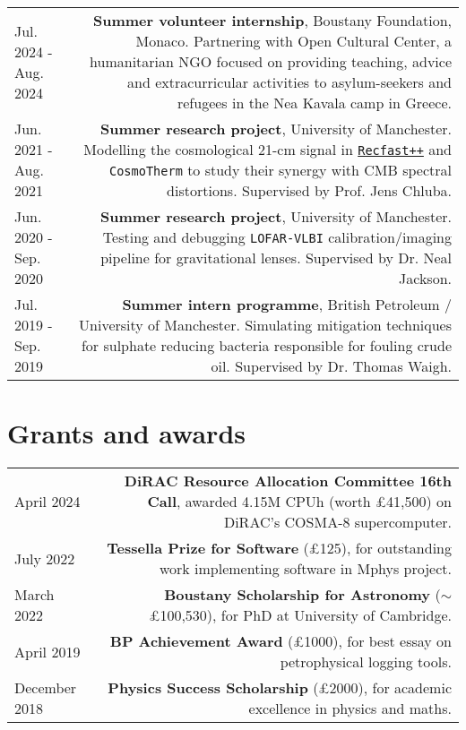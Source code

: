 \documentclass{article}
\begin{document}
\begin{longtable}{L!{\vrule}R}
    Jul. 2024 - Aug. 2024 & \textbf{Summer volunteer internship}, Boustany Foundation, Monaco. Partnering with Open Cultural Center, a humanitarian NGO focused on providing teaching, advice and extracurricular activities to asylum-seekers and refugees in the Nea Kavala camp in Greece.  \\
    Jun. 2021 - Aug. 2021 & \textbf{Summer research project}, University of Manchester. Modelling the cosmological 21-cm signal in \href{https://bitbucket.org/Jacetoto/recfast-.vx/src/Recfast_JD_21cm_modelling/}{\texttt{Recfast++}} and \texttt{CosmoTherm} to study their synergy with CMB spectral distortions. Supervised by Prof. Jens Chluba. \\
    Jun. 2020 - Sep. 2020 & \textbf{Summer research project}, University of Manchester. Testing and debugging \texttt{LOFAR-VLBI} calibration/imaging pipeline for gravitational lenses. Supervised by Dr. Neal Jackson.\\
    Jul. 2019 - Sep. 2019 & \textbf{Summer intern programme}, British Petroleum / University of Manchester. Simulating mitigation techniques for sulphate reducing bacteria responsible for fouling crude oil. Supervised by Dr. Thomas Waigh. \\
\end{longtable}

\section*{Grants and awards}

\begin{longtable}{L!{\vrule}R}

    April 2024 & \textbf{DiRAC Resource Allocation Committee 16th Call}, awarded 4.15M CPUh (worth £41,500) on DiRAC's COSMA-8 supercomputer. \\
    July 2022 & \textbf{Tessella Prize for Software} (£125), for outstanding work implementing software in Mphys project. \\
    March 2022 & \textbf{Boustany Scholarship for Astronomy} ($\sim$ £100,530), for PhD at University of Cambridge. \\
    April 2019 & \textbf{BP Achievement Award} (£1000), for best essay on petrophysical logging tools. \\
    December 2018 & \textbf{Physics Success Scholarship} (£2000), for academic excellence in physics and maths.\\

\end{longtable}
\end{document}
